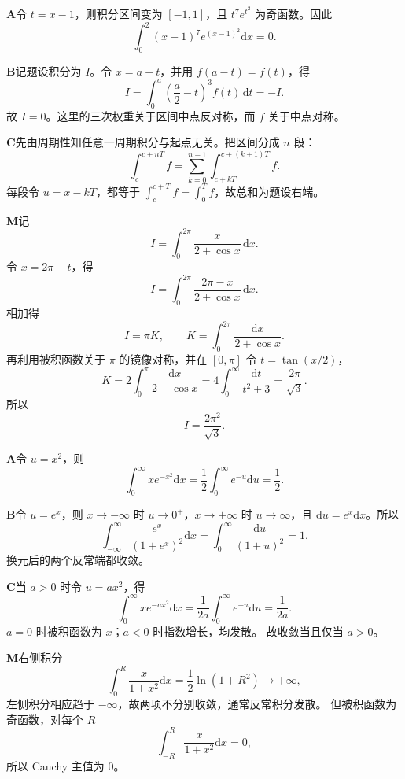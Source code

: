 \begin{solutionBox}
\textbf{A}\quad 令 \(t=x-1\)，则积分区间变为 \([-1,1]\)，且
\(t^7e^{t^2}\) 为奇函数。因此
\[
\boxed{\int_0^2(x-1)^7e^{(x-1)^2}\mathrm dx=0}.
\]
\end{solutionBox}
\begin{solutionBox}
\textbf{B}\quad 记题设积分为 \(I\)。令 \(x=a-t\)，并用
\(f(a-t)=f(t)\)，得
\[
I=\int_0^a\left(\frac a2-t\right)^3f(t)\,\mathrm dt=-I.
\]
故 \(\boxed{I=0}\)。这里的三次权重关于区间中点反对称，而 \(f\)
关于中点对称。
\end{solutionBox}
\begin{solutionBox}
\textbf{C}\quad 先由周期性知任意一周期积分与起点无关。把区间分成
\(n\) 段：
\[
\int_c^{c+nT}f
=\sum_{k=0}^{n-1}\int_{c+kT}^{c+(k+1)T}f.
\]
每段令 \(u=x-kT\)，都等于
\(\int_c^{c+T}f=\int_0^Tf\)，故总和为题设右端。
\end{solutionBox}
\begin{solutionBox}
\textbf{M}\quad 记
\[
I=\int_0^{2\pi}\frac{x}{2+\cos x}\,\mathrm dx.
\]
令 \(x=2\pi-t\)，得
\[
I=\int_0^{2\pi}\frac{2\pi-x}{2+\cos x}\,\mathrm dx.
\]
相加得
\[
I=\pi K,\qquad
K=\int_0^{2\pi}\frac{\mathrm dx}{2+\cos x}.
\]
再利用被积函数关于 \(\pi\) 的镜像对称，并在 \([0,\pi]\) 令
\(t=\tan(x/2)\)，
\[
K=2\int_0^\pi\frac{\mathrm dx}{2+\cos x}
=4\int_0^\infty\frac{\mathrm dt}{t^2+3}
=\frac{2\pi}{\sqrt3}.
\]
所以
\[
\boxed{I=\frac{2\pi^2}{\sqrt3}}.
\]
\end{solutionBox}

\begin{solutionBox}
\textbf{A}\quad 令 \(u=x^2\)，则
\[
\int_0^\infty xe^{-x^2}\mathrm dx
=\frac12\int_0^\infty e^{-u}\mathrm du
=\frac12.
\]
\end{solutionBox}
\begin{solutionBox}
\textbf{B}\quad 令 \(u=e^x\)，则
\(x\to-\infty\) 时 \(u\to0^+\)，\(x\to+\infty\) 时
\(u\to\infty\)，且 \(\mathrm du=e^x\mathrm dx\)。所以
\[
\int_{-\infty}^{\infty}\frac{e^x}{(1+e^x)^2}\mathrm dx
=\int_0^\infty\frac{\mathrm du}{(1+u)^2}=1.
\]
换元后的两个反常端都收敛。
\end{solutionBox}
\begin{solutionBox}
\textbf{C}\quad 当 \(a>0\) 时令 \(u=ax^2\)，得
\[
\int_0^\infty xe^{-ax^2}\mathrm dx
=\frac1{2a}\int_0^\infty e^{-u}\mathrm du
=\frac1{2a}.
\]
\(a=0\) 时被积函数为 \(x\)；\(a<0\) 时指数增长，均发散。
故收敛当且仅当 \(a>0\)。
\end{solutionBox}
\begin{solutionBox}
\textbf{M}\quad 右侧积分
\[
\int_0^R\frac{x}{1+x^2}\mathrm dx
=\frac12\ln(1+R^2)\to+\infty,
\]
左侧积分相应趋于 \(-\infty\)，故两项不分别收敛，通常反常积分发散。
但被积函数为奇函数，对每个 \(R\)
\[
\int_{-R}^{R}\frac{x}{1+x^2}\mathrm dx=0,
\]
所以 Cauchy 主值为 \(0\)。
\end{solutionBox}

